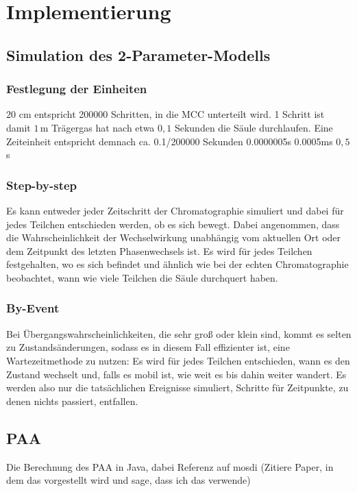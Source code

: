 
\chapter{Implementierung}
\label{chapter:imp}

\section{Simulation des 2-Parameter-Modells}

\subsection{Festlegung der Einheiten}
$20$ cm entspricht 200000 Schritten, in die MCC unterteilt wird.
1 Schritt ist damit $1$\,\textmu m
Trägergas hat nach etwa $0,1$ Sekunden die Säule durchlaufen.
Eine Zeiteinheit entspricht demnach ca. 0.1/200000 Sekunden 0.0000005s 0.0005ms $0,5$\,\textmu s


\subsection{Step-by-step}
Es kann entweder jeder Zeitschritt der Chromatographie simuliert und dabei für jedes Teilchen entschieden werden, ob es sich bewegt. Dabei angenommen, dass die Wahrscheinlichkeit der Wechselwirkung unabhängig vom aktuellen Ort oder dem Zeitpunkt des letzten Phasenwechsels ist. Es wird für jedes Teilchen festgehalten, wo es sich befindet und ähnlich wie bei der echten Chromatographie beobachtet, wann wie viele Teilchen die Säule durchquert haben. 

\subsection{By-Event}
Bei Übergangswahrscheinlichkeiten, die sehr groß oder klein sind, kommt es selten zu Zustandsänderungen, sodass es in diesem Fall effizienter ist, eine Wartezeitmethode zu nutzen: Es wird für jedes Teilchen entschieden, wann es den Zustand wechselt und, falls es mobil ist, wie weit es bis dahin weiter wandert. Es werden also nur die tatsächlichen Ereignisse simuliert, Schritte für Zeitpunkte, zu denen nichts passiert, entfallen.


\section{PAA}
Die Berechnung des PAA in Java, dabei Referenz auf mosdi (Zitiere Paper, in dem das vorgestellt wird und sage, dass ich das verwende)
